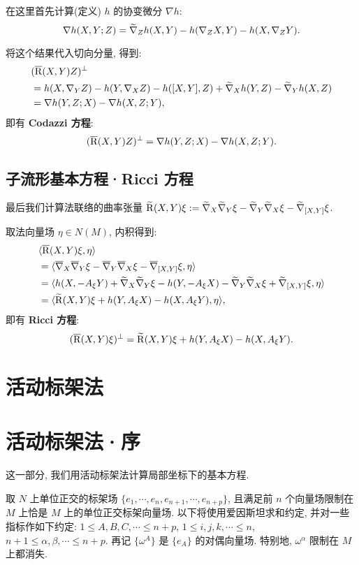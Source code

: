 \documentclass{ctexart}
\begin{document}
在这里首先计算(定义) $h$ 的协变微分 $\nabla h$:
$$
	\nabla h(X, Y; Z) = \widetilde{\nabla}_{Z}{h(X, Y)} - h(\nabla_{Z}{X}, Y) - h(X, \nabla_{Z}{Y}).
$$

将这个结果代入切向分量, 得到:
\begin{align*}
	&(\overline{\mathrm{R}}(X, Y)Z)^{\perp} \\
	&= h(X, \nabla_{Y}{Z}) - h(Y, \nabla_{X}{Z}) - h([X, Y], Z) + \widetilde{\nabla}_{X}{h(Y, Z)} - \widetilde{\nabla}_{Y}{h(X, Z)} \\
	&= \nabla h(Y, Z; X) - \nabla h(X, Z; Y),
\end{align*}
即有 {\bf Codazzi 方程}:
\begin{equation}\label{eq::Codazzi-equation}
	(\overline{\mathrm{R}}(X, Y)Z)^{\perp} = \nabla h(Y, Z; X) - \nabla h(X, Z; Y).
\end{equation}

\subsection{子流形基本方程·Ricci 方程}
最后我们计算法联络的曲率张量 $\widetilde{\mathrm{R}}(X, Y)\xi := \widetilde{\nabla}_{X}{\widetilde{\nabla}_{Y}{\xi}} - \widetilde{\nabla}_{Y}{\widetilde{\nabla}_{X}{\xi}} - \widetilde{\nabla}_{[X, Y]}{\xi}$.

取法向量场 $\eta \in N(M)$, 内积得到:
\begin{align*}
	&\langle {\overline{\mathrm{R}}(X, Y)\xi}, {\eta} \rangle \\
	&= \langle {\overline{\nabla}_{X}{\overline{\nabla}_{Y}{\xi}} - \overline{\nabla}_{Y}{\overline{\nabla}_{X}{\xi}} - \overline{\nabla}_{[X, Y]}{\xi}}, {\eta} \rangle \\
	&= \langle {h(X, -A_{\xi}{Y}) + \widetilde{\nabla}_{X}{\widetilde{\nabla}_{Y}{\xi}} - h(Y, -A_{\xi}{X}) - \widetilde{\nabla}_{Y}{\widetilde{\nabla}_{X}{\xi}} + \widetilde{\nabla}_{[X, Y]}{\xi}}, {\eta} \rangle \\
	&= \langle {\widetilde{\mathrm{R}}(X, Y)\xi + h(Y, A_{\xi}{X}) - h(X, A_{\xi}{Y})}, {\eta} \rangle, \\
\end{align*}
即有 {\bf Ricci 方程}:
\begin{equation}\label{eq::Ricci-equation}
	(\overline{\mathrm{R}}(X, Y)\xi)^{\perp} = \widetilde{\mathrm{R}}(X, Y)\xi + h(Y, A_{\xi}{X}) - h(X, A_{\xi}{Y}).
\end{equation}

\section{活动标架法}
\section{活动标架法·序}
这一部分, 我们用活动标架法计算局部坐标下的基本方程.

取 $N$ 上单位正交的标架场 $\{e_1, \cdots, e_n, e_{n + 1}, \cdots, e_{n + p}\}$, 且满足前 $n$ 个向量场限制在 $M$ 上恰是 $M$ 上的单位正交标架向量场. 以下将使用爱因斯坦求和约定, 并对一些指标作如下约定: $1 \leqslant A, B, C, \cdots \leqslant n + p$, $1 \leqslant i, j, k, \cdots \leqslant n$, $n + 1 \leqslant \alpha, \beta, \cdots \leqslant n + p$. 再记 $\{\omega^{A}\}$ 是 $\{e_{A}\}$ 的对偶向量场. 特别地, $\omega^\alpha$ 限制在 $M$ 上都消失.
\end{document}

